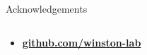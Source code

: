 \documentclass[aspectratio=169, 12pt]{beamer}
\begin{document}
\begin{frame}{Acknowledgements}
\begin{columns}
\begin{column}{0.5\textwidth}
\begin{itemize}
            \end{itemize}
            \begin{itemize}
                \item \href{https://github.com/winston-lab}{\textbf{github.com/winston-lab}}
            \end{itemize}
        \end{column}
    \end{columns}
\end{frame}
\end{document}
